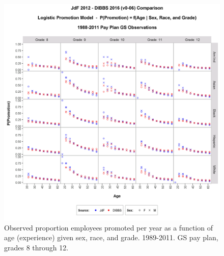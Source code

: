 \documentclass[10pt, letterpaper]{article}
\begin{document}
\begin{spacing}{1.0}
\begin{figure}[]
    \centering
    \includegraphics[width=6in, trim={0 0 0 1in}, clip]{PromotionSexRaceageGS8-12Observed.png}
    \caption{Observed proportion employees promoted per year as a function of age (experience) given sex, race, and grade.  1989-2011.  GS pay plan, grades 8 through 12.}
    \label{figure:PromotionSexRaceageGS8-12Observed}
\end{figure}

\clearpage


\end{spacing}
\end{document}
